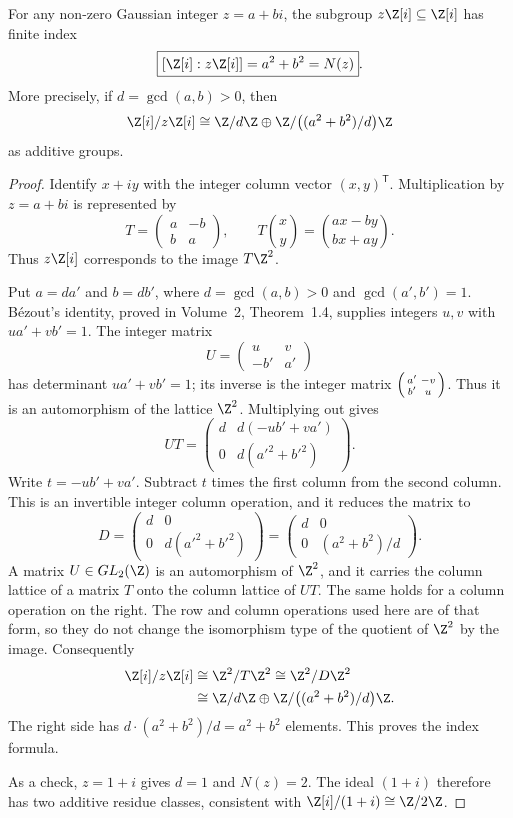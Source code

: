 \begin{theorem}\label{thm:normindex}
For any non-zero Gaussian integer $z=a+bi$, the subgroup
$z\Z[i]\subseteq\Z[i]$ has finite index
\[
\boxed{[\Z[i]:z\Z[i]]=a^2+b^2=N(z)}.
\]
More precisely, if $d=\gcd(a,b)>0$, then
\[
\Z[i]/z\Z[i]\cong
\Z/d\Z\oplus\Z/\bigl((a^2+b^2)/d\bigr)\Z
\]
as additive groups.
\end{theorem}
\begin{proof}
Identify $x+iy$ with the integer column vector $(x,y)^{\mathsf T}$.
Multiplication by $z=a+bi$ is represented by
\[
T=\begin{pmatrix}a&-b\\b&a\end{pmatrix},
\qquad
T\binom xy=\binom{ax-by}{bx+ay}.
\]
Thus $z\Z[i]$ corresponds to the image $T\Z^2$.

Put $a=da'$ and $b=db'$, where
$d=\gcd(a,b)>0$ and $\gcd(a',b')=1$.
Bézout's identity, proved in Volume~2, Theorem~1.4, supplies
integers $u,v$ with $ua'+vb'=1$.
The integer matrix
\[
U=\begin{pmatrix}u&v\\-b'&a'\end{pmatrix}
\]
has determinant $ua'+vb'=1$; its inverse is the integer matrix
$\begin{psmallmatrix}a'&-v\\b'&u\end{psmallmatrix}$. Thus it is an
automorphism of the lattice $\Z^2$.
Multiplying out gives
\[
UT=
\begin{pmatrix}
d&d(-ub'+va')\\
0&d(a'^2+b'^2)
\end{pmatrix}.
\]
Write $t=-ub'+va'$. Subtract $t$ times
the first column from the second column.
This is an invertible integer column operation,
and it reduces the matrix to
\[
D=\begin{pmatrix}d&0\\0&d(a'^2+b'^2)\end{pmatrix}
=\begin{pmatrix}d&0\\0&(a^2+b^2)/d\end{pmatrix}.
\]
A matrix $U\in GL_2(\Z)$ is an automorphism of $\Z^2$, and it carries the column lattice of a matrix $T$ onto the column lattice of $UT$. The same holds for a column operation on the right. The row and column operations used here are of that form, so they do not change
the isomorphism type of the quotient of $\Z^2$
by the image. Consequently
\[
\begin{aligned}
\Z[i]/z\Z[i]
&\cong\Z^2/T\Z^2
\cong\Z^2/D\Z^2\\
&\cong\Z/d\Z\oplus
\Z/\bigl((a^2+b^2)/d\bigr)\Z.
\end{aligned}
\]
The right side has $d\cdot(a^2+b^2)/d=a^2+b^2$
elements. This proves the index formula.

As a check, $z=1+i$ gives $d=1$ and
$N(z)=2$. The ideal $(1+i)$ therefore has
two additive residue classes, consistent
with $\Z[i]/(1+i)\cong\Z/2\Z$.
\end{proof}

